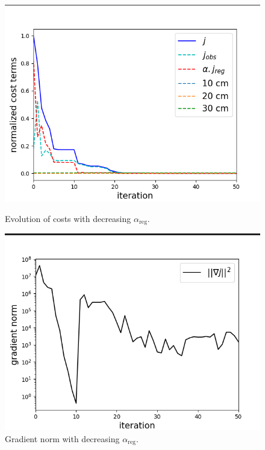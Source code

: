 \documentclass{article}
\begin{document}
\begin{figure}[H]
    \centering
    \begin{minipage}[b]{0.48\linewidth}
        \centering
        \includegraphics[width=\linewidth]{Images_Ayoub/With_Regularisation/Decreasing_Alpha/Costs.png}
        \caption{Evolution of costs with decreasing \( \alpha_{\text{reg}} \).}
        \label{fig:dec-costs}
    \end{minipage}
    \hfill
    \begin{minipage}[b]{0.48\linewidth}
        \centering
        \includegraphics[width=\linewidth]{Images_Ayoub/With_Regularisation/Decreasing_Alpha/Gradient.png}
        \caption{Gradient norm with decreasing \( \alpha_{\text{reg}} \).}
        \label{fig:dec-gradient}
    \end{minipage}
    

\end{figure}
\end{document}
